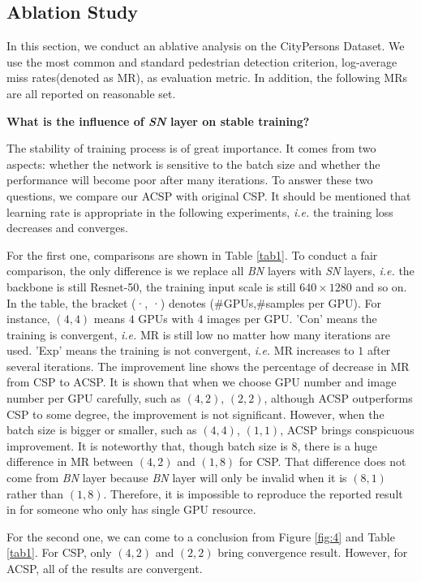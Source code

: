 \documentclass[twocolumn]{article}
\begin{document}
\subsection{Ablation Study}
In this section, we conduct an ablative analysis on the CityPersons Dataset\cite{zhang2017citypersons}. We use the most common and standard pedestrian detection criterion, log-average miss rates(denoted as MR), as evaluation metric. In addition, the following MRs are all reported on reasonable set. \par 
\textbf{What is the influence of \textit{SN} layer on stable training?}\par
The stability of training process is of great importance. It comes from two aspects: whether the network is sensitive to the batch size and whether the performance will become poor after many iterations. To answer these two questions, we compare our ACSP with original CSP\cite{liu2019high}. It should be mentioned that learning rate is  appropriate in the following experiments,  \textit{i.e.} the training loss decreases and converges.\par  
For the first one, comparisons are shown in Table \ref{tab1}. To conduct a fair comparison, the only difference is we replace all \textit{BN} layers with \textit{SN} layers, \textit{i.e.} the backbone is still Resnet-50, the training input scale is still $640 \times 1280$  and so on. In the table, the bracket (·, ·) denotes (\#GPUs,\#samples per GPU). For instance, $(4, 4)$ means $4$ GPUs with $4$ images per GPU. 'Con' means the training is convergent, \textit{i.e.} MR is still low no matter how many iterations are used. 'Exp' means the training is not convergent, \textit{i.e.} MR increases to $1$ after several iterations. The improvement line shows the percentage of decrease in MR from CSP\cite{liu2019high} to ACSP. It is shown that when we choose GPU number and image number per GPU carefully, such as $(4, 2)$, $(2, 2)$, although ACSP outperforms CSP\cite{liu2019high} to some degree, the improvement is not significant. However, when the batch size is bigger or smaller, such as  $(4, 4)$, $(1, 1)$, ACSP brings conspicuous improvement. It is noteworthy that, though batch size is $8$, there is a huge difference in MR between $(4, 2)$ and $(1, 8)$ for CSP\cite{liu2019high}. That difference does not come from \textit{BN} layer because  \textit{BN} layer will only be invalid when it is $(8, 1)$ rather than $(1, 8)$. Therefore, it is impossible to reproduce the reported result in \cite{liu2019high} for someone who only has single GPU resource. \par 
For the second one, we can come to a conclusion from Figure \ref{fig:4} and Table \ref{tab1}. For CSP\cite{liu2019high}, only $(4, 2)$ and $(2, 2)$ bring convergence result. However, for ACSP, all of the results are convergent.
\end{document}
